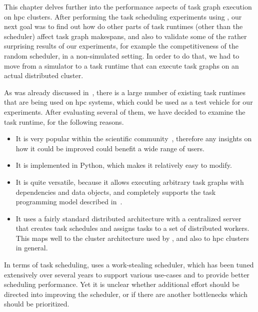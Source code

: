 This chapter delves further into the performance aspects of task graph execution on
\gls{hpc} clusters. After performing the task scheduling experiments using
\estee{}, our next goal was to find out how do other parts of task runtimes
(other than the scheduler) affect task graph makespans, and also to validate some of the rather
surprising results of our experiments, for example the competitiveness of the random scheduler, in
a non-simulated setting. In order to do that, we had to move from a simulator to a task runtime
that can execute task graphs on an actual distributed cluster.

As was already discussed in~, there is a large number of existing task
runtimes that are being used on \gls{hpc} systems, which could be used as a test
vehicle for our experiments. After evaluating several of them, we have decided to examine the
\dask{}~\cite{dask} task runtime, for the following reasons.
\begin{itemize}
	\setlength\itemsep{0.1em}
	\item It is very popular within the scientific community~\cite{dask-user-survey}, therefore any
	      insights on how it could be improved could benefit a wide range of users.
	\item It is implemented in Python, which makes it relatively easy to modify.
	\item It is quite versatile, because it allows executing arbitrary task graphs with dependencies and data
	      objects, and completely supports the task programming model described in~.
	\item It uses a fairly standard distributed architecture with a centralized server that creates task
	      schedules and assigns tasks to a set of distributed workers. This maps well to the cluster
	      architecture used by \estee{}, and also to \gls{hpc} clusters in
	      general.
\end{itemize}

In terms of task scheduling, \dask{} uses a work-stealing scheduler, which has
been tuned extensively over several years to support various use-cases and to provide better
scheduling performance. Yet it is unclear whether additional effort should be directed into
improving the scheduler, or if there are another bottlenecks which should be prioritized.

